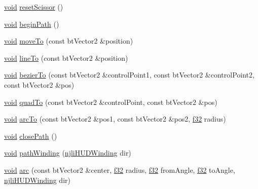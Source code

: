 \begin{DoxyCompactItemize}
\item 
\mbox{\hyperlink{_thread_8h_af1e856da2e658414cb2456cb6f7ebc66}{void}} \mbox{\hyperlink{classnjli_1_1_world_h_u_d_a1510b2540e17040abc985f2b3485ea71}{reset\+Scissor}} ()
\item 
\mbox{\hyperlink{_thread_8h_af1e856da2e658414cb2456cb6f7ebc66}{void}} \mbox{\hyperlink{classnjli_1_1_world_h_u_d_ab5d63556e0d0e28e4458bb146e751b64}{begin\+Path}} ()
\item 
\mbox{\hyperlink{_thread_8h_af1e856da2e658414cb2456cb6f7ebc66}{void}} \mbox{\hyperlink{classnjli_1_1_world_h_u_d_ae93e5164ed89c2404f759efba1282383}{move\+To}} (const bt\+Vector2 \&position)
\item 
\mbox{\hyperlink{_thread_8h_af1e856da2e658414cb2456cb6f7ebc66}{void}} \mbox{\hyperlink{classnjli_1_1_world_h_u_d_aba89dd5d668b6f7de9b943d13411961f}{line\+To}} (const bt\+Vector2 \&position)
\item 
\mbox{\hyperlink{_thread_8h_af1e856da2e658414cb2456cb6f7ebc66}{void}} \mbox{\hyperlink{classnjli_1_1_world_h_u_d_a579fd8f82fda136d3bb2f916bbf767b3}{bezier\+To}} (const bt\+Vector2 \&control\+Point1, const bt\+Vector2 \&control\+Point2, const bt\+Vector2 \&pos)
\item 
\mbox{\hyperlink{_thread_8h_af1e856da2e658414cb2456cb6f7ebc66}{void}} \mbox{\hyperlink{classnjli_1_1_world_h_u_d_a8cefd17fd4ee43b393810cf5b6f92c3a}{quad\+To}} (const bt\+Vector2 \&control\+Point, const bt\+Vector2 \&pos)
\item 
\mbox{\hyperlink{_thread_8h_af1e856da2e658414cb2456cb6f7ebc66}{void}} \mbox{\hyperlink{classnjli_1_1_world_h_u_d_a71d2a7e98e92f02d75f80947ca93157f}{arc\+To}} (const bt\+Vector2 \&pos1, const bt\+Vector2 \&pos2, \mbox{\hyperlink{_util_8h_a5f6906312a689f27d70e9d086649d3fd}{f32}} radius)
\item 
\mbox{\hyperlink{_thread_8h_af1e856da2e658414cb2456cb6f7ebc66}{void}} \mbox{\hyperlink{classnjli_1_1_world_h_u_d_a83640be06ba258db7a44297d561364e3}{close\+Path}} ()
\item 
\mbox{\hyperlink{_thread_8h_af1e856da2e658414cb2456cb6f7ebc66}{void}} \mbox{\hyperlink{classnjli_1_1_world_h_u_d_ab8e986fe57556113de8902cd91e58725}{path\+Winding}} (\mbox{\hyperlink{namespacenjli_adfddace364f1f59d370037cf6f934456}{njli\+H\+U\+D\+Winding}} dir)
\item 
\mbox{\hyperlink{_thread_8h_af1e856da2e658414cb2456cb6f7ebc66}{void}} \mbox{\hyperlink{classnjli_1_1_world_h_u_d_a09909494112f37d1ae3b3729e505769d}{arc}} (const bt\+Vector2 \&center, \mbox{\hyperlink{_util_8h_a5f6906312a689f27d70e9d086649d3fd}{f32}} radius, \mbox{\hyperlink{_util_8h_a5f6906312a689f27d70e9d086649d3fd}{f32}} from\+Angle, \mbox{\hyperlink{_util_8h_a5f6906312a689f27d70e9d086649d3fd}{f32}} to\+Angle, \mbox{\hyperlink{namespacenjli_adfddace364f1f59d370037cf6f934456}{njli\+H\+U\+D\+Winding}} dir)

\end{DoxyCompactItemize}
